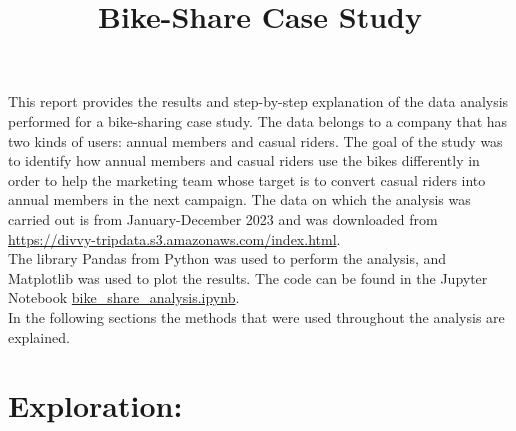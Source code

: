 \documentclass[12pt]{article}
\begin{document}
\title{Bike-Share Case Study}
\date{}
\maketitle

This report provides the results and step-by-step explanation of the data analysis performed for a bike-sharing case study. The data belongs to a company that has two kinds of users: annual members and casual riders. The goal of the study was to identify how annual members and casual riders use the bikes differently in order to help the marketing team whose target is to convert casual riders into annual members in the next campaign. The data on which the analysis was carried out is from January-December 2023 and was downloaded from \url{https://divvy-tripdata.s3.amazonaws.com/index.html}. \\

The library Pandas from Python was used to perform the analysis, and Matplotlib was used to plot the results. The code can be found in the Jupyter Notebook \href{https://github.com/SummerKassem/BikeShareCS/blob/main/Code/bike_share_analysis.ipynb}{bike\_share\_analysis.ipynb}. \\

In the following sections the methods that were used throughout the analysis are explained. 

\section*{Exploration:}
\end{document}
